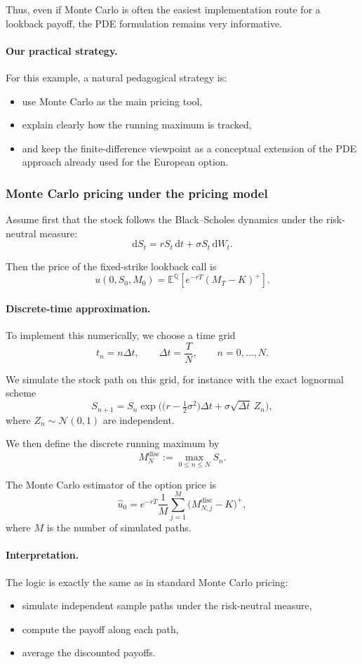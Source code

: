 \documentclass[11pt]{article}
\newcommand{\Qbb}{\mathbb{Q}}
\newcommand{\E}{\mathbb{E}}
\theoremstyle{plain}
\theoremstyle{definition}
\theoremstyle{remark}
\begin{document}
Thus, even if Monte Carlo is often the easiest implementation route for
a lookback payoff, the PDE formulation remains very informative.

\paragraph{Our practical strategy.}
For this example, a natural pedagogical strategy is:
\begin{itemize}[leftmargin=1.4em]
    \item use Monte Carlo as the main pricing tool,
    \item explain clearly how the running maximum is tracked,
    \item and keep the finite-difference viewpoint as a conceptual
    extension of the PDE approach already used for the European option.
\end{itemize}

\subsubsection{Monte Carlo pricing under the pricing model}

Assume first that the stock follows the Black--Scholes dynamics under
the risk-neutral measure:
\[
\mathrm{d}S_t=rS_t\,\mathrm{d}t+\sigma S_t\,\mathrm{d}W_t.
\]

Then the price of the fixed-strike lookback call is
\[
u(0,S_0,M_0)
=
\E^\Qbb\!\left[
e^{-rT}(M_T-K)^+
\right].
\]

\paragraph{Discrete-time approximation.}
To implement this numerically, we choose a time grid
\[
t_n=n\Delta t,
\qquad
\Delta t=\frac{T}{N},
\qquad
n=0,\dots,N.
\]

We simulate the stock path on this grid, for instance with the exact
lognormal scheme
\[
S_{n+1}
=
S_n\exp\!\Big(
\big(r-\tfrac12\sigma^2\big)\Delta t+\sigma\sqrt{\Delta t}\,Z_n
\Big),
\]
where \(Z_n\sim\mathcal N(0,1)\) are independent.

We then define the discrete running maximum by
\[
M_N^{\mathrm{disc}}
:=
\max_{0\le n\le N}S_n.
\]

The Monte Carlo estimator of the option price is
\[
\widehat u_0
=
e^{-rT}\frac1M
\sum_{j=1}^M
\Big(M_{N,j}^{\mathrm{disc}}-K\Big)^+,
\]
where \(M\) is the number of simulated paths.

\paragraph{Interpretation.}
The logic is exactly the same as in standard Monte Carlo pricing:
\begin{itemize}[leftmargin=1.4em]
    \item simulate independent sample paths under the risk-neutral
    measure,
    \item compute the payoff along each path,
    \item average the discounted payoffs.
\end{itemize}
\end{document}
